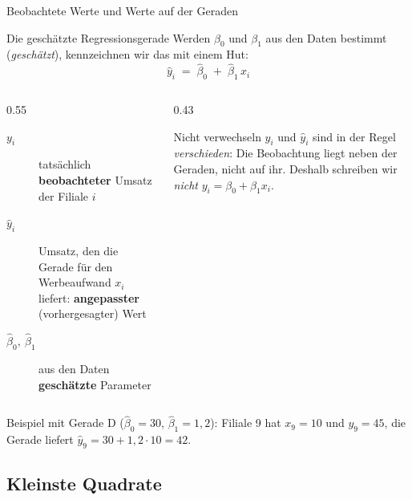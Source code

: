 \documentclass[aspectratio=169,11pt]{beamer}
\begin{document}
\begin{frame}{Beobachtete Werte und Werte auf der Geraden}
  \begin{block}{Die geschätzte Regressionsgerade}
    Werden $\beta_0$ und $\beta_1$ aus den Daten bestimmt (\emph{geschätzt}),
    kennzeichnen wir das mit einem \glqq Hut\grqq:
    \[
      \hat{y}_i \;=\; \hat{\beta}_0 \;+\; \hat{\beta}_1\, x_i
    \]
  \end{block}

  \begin{columns}[T]
    \begin{column}{0.55\textwidth}
      \begin{description}
        \item[$y_i$] tatsächlich \textbf{beobachteter} Umsatz der Filiale $i$
        \item[$\hat{y}_i$] Umsatz, den die Gerade für den Werbeaufwand $x_i$
              liefert: \textbf{angepasster} (vorhergesagter) Wert
        \item[$\hat{\beta}_0,\ \hat{\beta}_1$] aus den Daten \textbf{geschätzte} Parameter
      \end{description}
    \end{column}
    \begin{column}{0.43\textwidth}
      \begin{alertblock}{Nicht verwechseln}
        $y_i$ und $\hat{y}_i$ sind in der Regel \emph{verschieden}: Die
        Beobachtung liegt neben der Geraden, nicht auf ihr. Deshalb schreiben wir
        \emph{nicht} $y_i = \beta_0 + \beta_1 x_i$.
      \end{alertblock}
    \end{column}
  \end{columns}

  \medskip
  \footnotesize Beispiel mit Gerade D ($\hat{\beta}_0 = 30$, $\hat{\beta}_1 = 1{,}2$):
  Filiale 9 hat $x_9 = 10$ und $y_9 = 45$, die Gerade liefert
  $\hat{y}_9 = 30 + 1{,}2 \cdot 10 = 42$.
\end{frame}

\subsection{Kleinste Quadrate}
\end{document}

